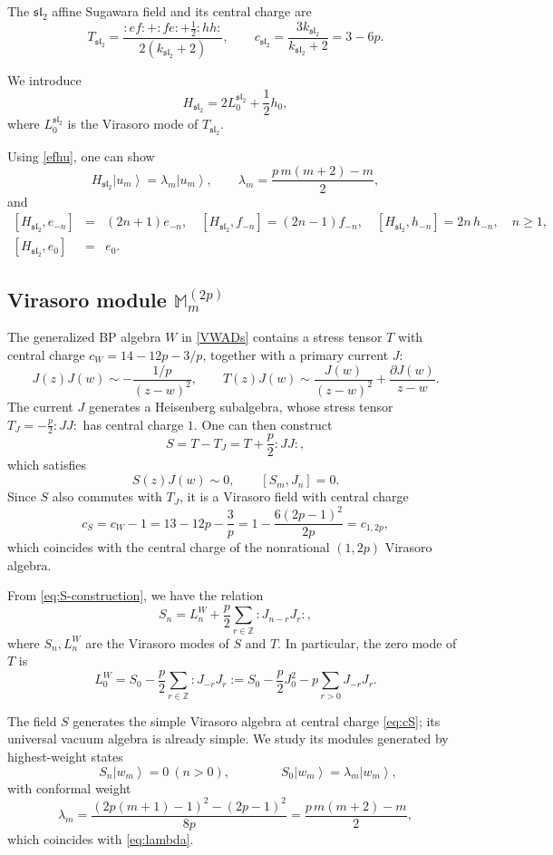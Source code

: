 \documentclass[a4paper,11pt]{article}
\theoremstyle{definition}
\theoremstyle{definition}
\theoremstyle{remark}
\newcommand{\ket}[1]{\ensuremath{\left|#1\right\rangle}}
\newcommand{\be}{\begin{equation}}
\newcommand{\ee}{\end{equation}}
\newcommand{\beqn}{\begin{eqnarray}}
\newcommand{\eeqn}{\end{eqnarray}}
\newcommand{\Z}{\mathbb Z}
\begin{document}
 
 

The  $\mathfrak{sl}_2$ affine Sugawara field and its central charge are
\be
T_{\mathfrak{sl}_2}
=\frac{:ef:+:fe:+\tfrac12:hh:}{2({k_{\mathfrak{sl}_2}}+2)},
\qquad c_{\mathfrak{sl}_2}=\frac{3{k_{\mathfrak{sl}_2}}}{{k_{\mathfrak{sl}_2}}+2}=3-6p.
\ee
 
We introduce 
\be\label{Hsl2}
H_{\mathfrak{sl}_2}=2L_0^{\mathfrak{sl}_2}+\frac12h_0,
\ee
where $L_0^{\mathfrak{sl}_2}$ is the Virasoro mode of $T_{\mathfrak{sl}_2}$.

Using \eqref{efhu}, one can show 
\be
H_{\mathfrak{sl}_2}\ket{u_m}=\lambda_m \ket{u_m},
\qquad \lambda_m=\frac{p\,m(m+2)-m}{2},
\label{eq:lambda}
\ee
and
\beqn\label{sl2H1}
[H_{\mathfrak{sl}_2}, e_{-n}] &=& (2n+1)e_{-n}, \quad  
[H_{\mathfrak{sl}_2}, f_{-n}]  = (2n-1)f_{-n}, \quad  
[H_{\mathfrak{sl}_2}, h_{-n}]  = 2n\,h_{-n},\quad n\ge 1, \qquad\quad \\
{}[H_{\mathfrak{sl}_2}, e_0] &=& e_0.
\label{sl2H2}
\eeqn
 

 
\subsection*{Virasoro module
$\mathbb M_m^{(2p)}$}

The generalized BP algebra $W$ in  \eqref{VWADs} contains a stress tensor  $T$ with central charge
$c_W=14-12p-3/p$, together with  a  primary current $J$:
\be
J(z)J(w)\sim-\frac{1/p}{(z-w)^2},
\qquad
T(z)J(w)\sim\frac{J(w)}{(z-w)^2}
+\frac{\partial J(w)}{z-w}.
\label{eq:TJ}
\ee
The current $J$ generates a  Heisenberg subalgebra, whose stress tensor $T_J=-\tfrac p2:JJ:$ has central
charge $1$. One can then construct 
\be
S=T-T_J=T+\frac p2:JJ:,
\label{eq:S-construction}
\ee
which satisfies
\be
S(z)J(w)\sim0,\qquad [S_m,J_n]=0.
\label{eq:SJ}
\ee
Since $S$ also commutes with $T_J$, it is a Virasoro field with central charge
\be
c_S=c_W-1=13-12p-\frac3p
=1-\frac{6(2p-1)^2}{2p}=c_{1,2p},
\label{eq:cS}
\ee
which coincides with  the central charge of the nonrational $(1,2p)$ Virasoro algebra.

From \eqref{eq:S-construction}, we have the relation
\be
S_n=L_n^W+\frac p2\sum_{r\in\Z}:J_{n-r}J_r:,
\ee
where $S_n,L_n^W$ are the Virasoro modes of $S$ and $T$.
In particular, the zero mode of $T$ is 
\be
L_0^W= S_0 -\frac p2\sum_{r\in\Z}:J_{-r}J_r:=S_0-\frac p2J_0^2-p\sum_{r>0}J_{-r}J_r.
\label{eq:target-grading}
\ee

 
  

 The field $S$ generates the simple Virasoro algebra at central charge \eqref{eq:cS}; its universal vacuum algebra is already simple.  We study its modules generated by highest-weight states~\cite{Adamovic:2025efe}
\be 
\qquad S_n\ket{w_m}=0\ (n>0),\qquad\qquad S_0\ket{w_m}=\lambda_m\ket{w_m},
\label{eq:vir-simple}
\ee
with conformal weight 
\be\label{lambdam}
\lambda_m
=\frac{(2p(m+1)-1)^2-(2p-1)^2}{8p}=\frac{p\,m(m+2)-m}{2},
\ee
which coincides with \eqref{eq:lambda}. 
\end{document}
